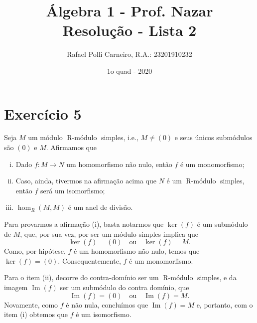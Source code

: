 \documentclass[11pt,twoside,a4paper]{article}
\title{Álgebra 1 - Prof. Nazar \\ Resolução - Lista 2}
\author{Rafael Polli Carneiro, R.A.: 23201910232}
\date{1o quad - 2020}
\DeclareMathOperator{\RMod}{ R-\text{módulo}}
\DeclareMathOperator {\Imagem}{ Im }
\theoremstyle{remark}
\theoremstyle{definition}
\theoremstyle{plain}
\begin{document}
\maketitle
\tableofcontents

\section{Exercício 5}
Seja $M$ um módulo $\RMod$ simples, i.e., $M \neq (0)$ e seus únicos submódulos são $(0)$ e $M$.
Afirmamos que
\begin{enumerate}[(i)]
    \item Dado $f: M \to N$ um homomorfismo não nulo, então $f$ é um monomorfismo;
    \item Caso, ainda, tivermos na afirmação acima que $N$ é um $\RMod$ simples, então
          $f$ será um isomorfismo;
    \item $\hom_R(M,M)$ é um anel de divisão.
\end{enumerate}

Para provarmos a afirmação (i), basta notarmos que $\ker(f)$ é um submódulo de $M$, que, por sua vez,
por ser um módulo simples implica que
    \[ \ker(f) = (0) \quad \text{ou} \quad \ker(f) = M.\]
Como, por hipótese, $f$ é um homomorfismo não nulo, temos que $\ker(f) = (0)$. Consequentemente,
$f$ é um monomorfismo.

Para  o item (ii), decorre do contra-domínio ser um $\RMod$ simples, e da imagem $\Imagem(f)$ ser um submódulo
do contra domínio, que
    \[ \Imagem(f) = (0) \quad \text{ou} \quad \Imagem(f) = M.\]
Novamente, como $f$ é não  nula, concluímos que $\Imagem(f) = M$ e, portanto, com o item (i) obtemos que
$f$ é um isomorfismo.
\end{document}
